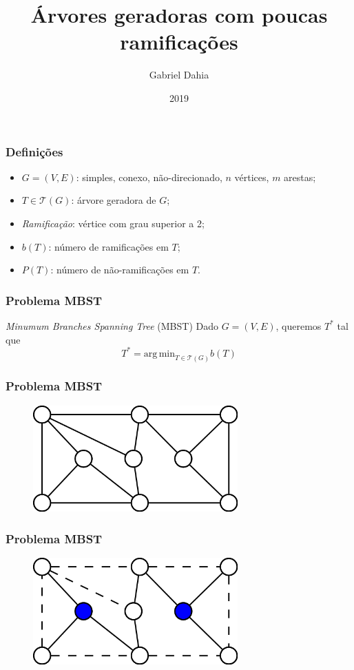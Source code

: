 \documentclass[14pt]{beamer}
\title{\'Arvores geradoras com poucas ramifica\c{c}\~oes}
\author{Gabriel Dahia}
\institute{Universidade Federal da Bahia}
\date{2019}
\begin{document}
\frame{\titlepage}

\begin{frame}
\frametitle{Defini\c{c}\~oes}
\begin{itemize}
\item<1-> $G = (V, E)$: simples, conexo, n\~ao-direcionado, $n$ v\'ertices, $m$ arestas;
\item<2-> $T \in \mathcal{T}(G)$: \'arvore geradora de $G$;
\item<3-> \emph{Ramifica\c{c}\~ao}: v\'ertice com grau superior a 2;
\item<4-> $b(T)$: n\'umero de ramifica\c{c}\~oes em $T$;
\item<4-> $P(T)$: n\'umero de n\~ao-ramifica\c{c}\~oes em $T$.
\end{itemize}
\end{frame}

\begin{frame}
\frametitle{Problema MBST}
\begin{block}{\textit{Minumum Branches Spanning Tree} (MBST)}
Dado $G = (V, E)$, queremos $T^*$ tal que
\begin{equation}
T^* = \mathrm{arg\,min}_{T \in \mathcal{T}(G)} b(T)
\end{equation}
\end{block}
\end{frame}

\begin{frame}
\frametitle{Problema MBST}
\begin{figure}
\includegraphics[width=0.7\textwidth]{figures/minbst1.png}
\end{figure}
\end{frame}

\begin{frame}
\frametitle{Problema MBST}
\begin{figure}
\includegraphics[width=0.7\textwidth]{figures/minbst2.png}
\end{figure}
\end{frame}
\end{document}
